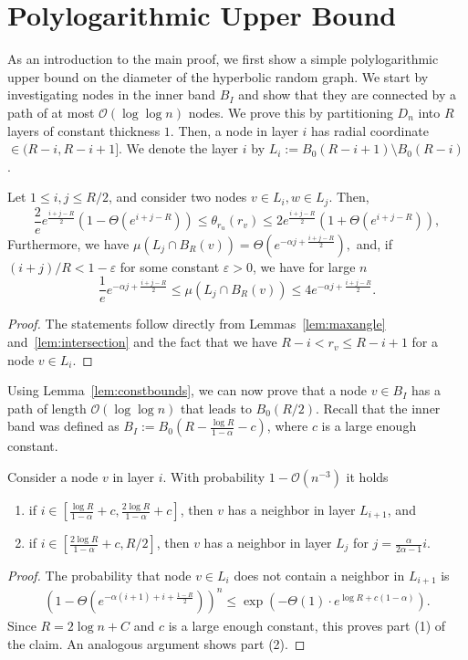 \documentclass{llncs}
\newcommand{\Oh}{\mathcal{O}}
\newcommand{\lemref}[1]{Lemma~\ref{lem:#1}}
\newcommand{\lemrefs}[2]{Lemmas~\ref{lem:#1} and~\ref{lem:#2}}
\newcommand{\eps}{\ensuremath{\varepsilon}}
\renewcommand{\leq}{\leqslant}
\begin{document}
\section{Polylogarithmic Upper Bound}
\label{sec:polyupper}
As an introduction to the main proof, we first show a simple polylogarithmic upper bound on the diameter of the hyperbolic random graph. We start by  investigating nodes in the inner band $B_I$ and show that they are connected by a path of at most $\Oh(\log \log n)$ nodes.  
We prove this by partitioning $D_n$ into $R$ layers of constant thickness $1$. Then, a node in layer $i$ has radial coordinate $\in (R - i, R-i+1]$. We denote the layer $i$ by $L_i := B_0(R-i+1) \setminus B_0(R-i)$.
\begin{lemma}
\label{lem:constbounds}
Let $1 \leq i,j \leq R/2$, and consider two nodes $v \in L_i, w \in L_j$. Then,
$$\frac2ee^{\frac{i+j-R}{2}} (1 - \Theta(e^{i+j-R})) \leq \theta_{r_u}(r_v) \leq  2e^{\frac{i+j-R}{2}} (1 + \Theta(e^{i+j-R})),$$
Furthermore, we have
$\mu(L_j \cap B_R(v)) = \Theta(e^{-\alpha j + \frac{i+j-R}{2}}),$
and, if $(i+j)/R < 1-\eps$ for some constant $\eps > 0$, we have for large $n$
$$\frac1e e^{-\alpha j + \frac{i+j-R}{2}} \leq \mu(L_j \cap B_R(v)) \leq 4 e^{-\alpha j + \frac{i+j-R}{2}}. $$
\end{lemma}
\begin{proof}
The statements follow directly from \lemrefs{maxangle}{intersection} and the fact that we have $R-i < r_v \leq R - i +1$ for a node $v \in L_i$.
\end{proof}
Using \lemref{constbounds}, we can now prove that a node $v \in B_I$ has a path of length $\Oh(\log \log n)$ that leads to $B_0(R/2)$. Recall that the inner band was defined as $B_I := B_0(R-\tfrac{\log R}{1-\alpha} - c)$, where $c$ is a large enough constant.
\begin{lemma}
\label{lem:diamlarge}
Consider a node $v$ in layer $i$. With probability $1-\Oh(n^{-3})$ it holds 
\begin{enumerate}
\item if $i \in [\tfrac{\log R}{1-\alpha} + c, \tfrac{2\log R}{1-\alpha} +c]$, then $v$ has a neighbor in layer $L_{i+1}$, and
\item if $i \in [\tfrac{2\log R}{1-\alpha} +c, R/2] $, then $v$ has a neighbor in layer $L_j$ for $j=\tfrac{\alpha}{2\alpha-1} i$.
\end{enumerate}
\end{lemma}
\begin{proof}
The probability that node $v \in L_i$ does not contain a neighbor in $L_{i+1}$ is
\begin{align*}
(1-\Theta(e^{-\alpha (i+1) + i + \frac{1-R}{2}}))^n \leq \exp(-\Theta(1) \cdot e^{\log R + c(1-\alpha)}).
\end{align*}
Since $R = 2\log n +C$ and $c$ is a large enough constant, this proves part (1) of the claim. An analogous argument shows part (2).
\end{proof}
\end{document}
